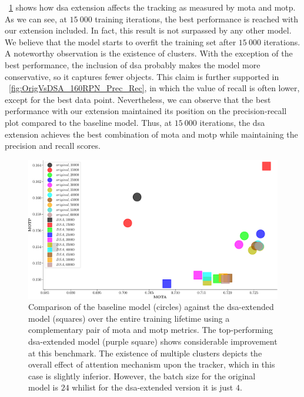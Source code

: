 \figtext{}~\ref{fig:OrigVsDSA_160RPN_MOTA_MOTP} shows how \gls{dsa} extension affects the tracking as measured by \gls{mota} and \gls{motp}. As we can see, at $15\ 000$ training iterations, the best performance is reached with our extension included. In fact, this result is not surpassed by any other model. We believe that the model starts to overfit the training set after $15\ 000$ iterations. A noteworthy observation is the existence of clusters. With the exception of the best performance, the inclusion of \gls{dsa} probably makes the model more conservative, so it captures fewer objects. This claim is further supported in \figtext{}~\ref{fig:OrigVsDSA_160RPN_Prec_Rec}, in which the value of recall is often lower, except for the best data point. Nevertheless, we can observe that the best performance with our extension maintained its position on the precision-recall plot compared to the baseline model. Thus, at $15\ 000$ iterations, the \gls{dsa} extension achieves the best combination of \gls{mota} and \gls{motp} while maintaining the precision and recall scores.

\begin{figure}[t]
    \centerline{\includegraphics[width=\linewidth]{figures/siamese_tracking/tracker_cmp_160_2x12_vs_160_2x2_DSA_MOTA_MOTP.pdf}}
    \caption[\gls{dsa} evaluation - primary metrics]{Comparison of the baseline model (circles) against the \gls{dsa}-extended model (squares) over the entire training lifetime using a complementary pair of \gls{mota} and \gls{motp} metrics. The top-performing \gls{dsa}-extended model (purple square) shows considerable improvement at this benchmark. The existence of multiple clusters depicts the overall effect of attention mechanism upon the tracker, which in this case is slightly inferior. However, the batch size for the original model is $24$ whilist for the \gls{dsa}-extended version it is just $4$.}
    \label{fig:OrigVsDSA_160RPN_MOTA_MOTP}
\end{figure}


